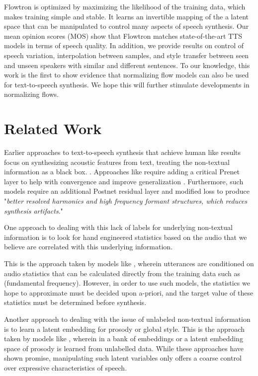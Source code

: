 \documentclass{article}
\begin{document}
Flowtron is optimized by maximizing the likelihood of the training data, which makes training simple and stable. It learns an invertible mapping of the a latent space that can be manipulated to control many aspects of speech synthesis. Our mean opinion scores (MOS) show that Flowtron matches state-of-the-art TTS models in terms of speech quality. In addition, we provide results on control of speech variation, interpolation between samples, and style transfer between seen and unseen speakers with similar and different sentences. To our knowledge, this work is the first to show evidence that normalizing flow models can also be used for text-to-speech synthesis. We hope this will further stimulate developments in normalizing flows. \section{Related Work}\label{sec:related_work}
Earlier approaches to text-to-speech synthesis that achieve human like results focus on synthesizing acoustic features from text, treating the non-textual information as a black box. \cite{shen2017natural,arik2017deep,arik2017deep2,ping2017deep}. Approaches like \cite{wang2017tacotron,shen2017natural} require adding a critical Prenet layer to help with convergence and improve generalization \cite{wang2017tacotron}. Furthermore, such models require an additional Postnet residual layer and modified loss to produce "\textit{better resolved harmonics and high frequency formant structures, which reduces synthesis artifacts}."

One approach to dealing with this lack of labels for underlying non-textual information is to look for hand engineered statistics based on the audio that we believe are correlated with this underlying information.

This is the approach taken by models like \cite{Nishimura2016SVS,lee2019adversarially}, wherein utterances are conditioned on audio statistics that can be calculated directly from the training data such as  (fundamental frequency). However, in order to use such models, the statistics we hope to approximate must be decided upon a-priori, and the target value of these statistics must be determined before synthesis.

Another approach to dealing with the issue of unlabeled non-textual information is to learn a latent embedding for prosody or global style. This is the approach taken by models like \cite{skerry2018towards,wang2018style}, wherein in a bank of embeddings or a latent embedding space of prosody is learned from unlabelled data. While these approaches have shown promise, manipulating such latent variables only offers a coarse control over expressive characteristics of speech. 
\end{document}
